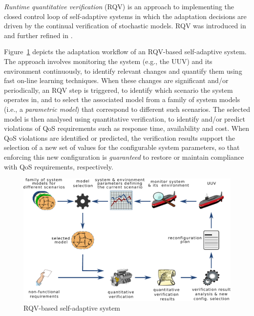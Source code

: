 
\textit{Runtime quantitative verification} (RQV) \cite{Calinescu2012:ACM} is an approach to implementing the closed control loop of self-adaptive systems in which the adaptation decisions are driven by the continual verification of stochastic models. RQV was introduced in \cite{Calinescu2009:ICSE,Epifani2009:ICSE} and further refined in \cite{Calinescu2011:TSE,Filieri2011:ICSE,Johnson2013:CBSE}. 


Figure~\ref{fig:RQV} depicts the adaptation workflow of an RQV-based self-adaptive system. The approach involves monitoring the system (e.g., the UUV) and its environment continuously, to identify relevant changes and quantify them using fast on-line learning techniques. When these changes are significant and/or periodically, an RQV step is triggered, to identify which scenario the system operates in, and to select the associated model from a family of system models (i.e., a \emph{parametric model}) that correspond to different such scenarios. The selected model is then analysed using quantitative verification, to identify and/or predict violations of QoS requirements such as response time, availability and cost. When QoS violations are identified or predicted, the verification results support the selection of a new set of values for the configurable system parameters, so that enforcing this new configuration is \emph{guaranteed} to restore or maintain compliance with QoS requirements, respectively.

\begin{figure}[t]
\centering
\includegraphics[width=0.75\hsize]{figures/rqv.pdf}
\caption{RQV-based self-adaptive system}
\label{fig:RQV}

\vspace*{-2mm}
\end{figure}